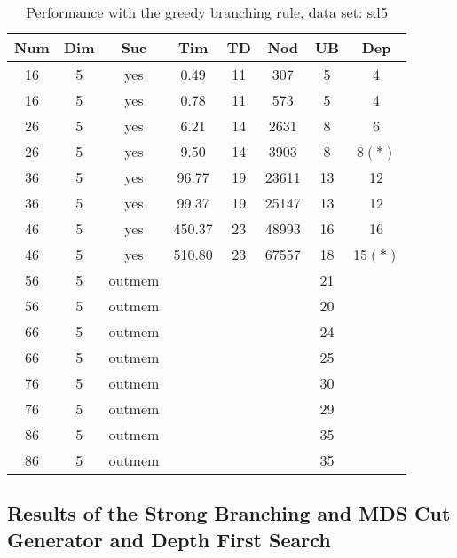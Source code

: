\begin{table}[!htb]
  \centering
  \begin{tabular}[center]{|c|c|c|c|c|c|c|c|}
    \hline
    Num & Dim & Suc & Tim & TD & Nod & UB & Dep \\
    \hline
    16 & 5 & yes & 0.49 & 11 & 307 & 5 & 4 \\
    16 & 5 & yes & 0.78 & 11 & 573 & 5 & 4 \\
    26 & 5 & yes & 6.21 & 14 & 2631 & 8 & 6 \\
    26 & 5 & yes & 9.50 & 14 & 3903 & 8 & 8$(*)$ \\
    36 & 5 & yes & 96.77 & 19 & 23611 & 13 & 12 \\
    36 & 5 & yes & 99.37 & 19 & 25147 & 13 & 12 \\
    46 & 5 & yes & 450.37 & 23 & 48993 & 16 & 16 \\
    46 & 5 & yes & 510.80 & 23 & 67557 & 18 & 15$(*)$ \\
    56 & 5 & outmem &  &  &  & 21 &  \\
    56 & 5 & outmem &&&& 20 &\\
    66 & 5 & outmem &&&& 24 &\\
    66 & 5 & outmem &  &  &  & 25 &  \\
    76 & 5 & outmem &&&& 30 &\\
    76 & 5 & outmem &&&& 29 &\\
    86 & 5 & outmem &&&& 35 &\\
    86 & 5 & outmem &&&& 35 &\\
    \hline
  \end{tabular}
  \caption{Performance with the greedy branching rule, data set: sd5}
  \label{tab:test.cutmds-sd5}
\end{table}

\clearpage
\subsection{Results of the Strong Branching and MDS Cut Generator and Depth First Search}
\label{sec:apd.bac.bran}

